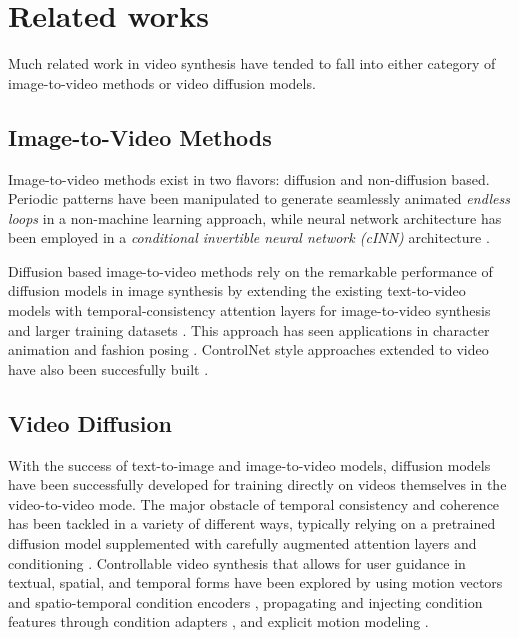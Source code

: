 \section{Related works}
\label{sec:related_work}

Much related work in video synthesis have tended to fall into either category of image-to-video methods or video diffusion models.

\subsection{Image-to-Video Methods}

Image-to-video methods exist in two flavors: diffusion and non-diffusion based. Periodic patterns have been manipulated to generate seamlessly animated \emph{endless loops} \cite{Halperin_2021} in a non-machine learning approach, while neural network architecture has been employed in a \emph{conditional invertible neural network (cINN)} architecture \cite{dorkenwald2021stochasticimagetovideosynthesisusing}.

Diffusion based image-to-video methods rely on the remarkable performance of diffusion models in image synthesis by extending the existing text-to-video models with temporal-consistency attention layers for image-to-video synthesis and larger training datasets \cite{blattmann2023stablevideodiffusionscaling}. This approach has seen applications in character animation \cite{hu2024animateanyoneconsistentcontrollable} and fashion posing \cite{52750}. ControlNet \cite{zhang2023addingconditionalcontroltexttoimage} style approaches extended to video have also been succesfully built \cite{zhang2023controlvideotrainingfreecontrollabletexttovideo}.


\subsection{Video Diffusion}

With the success of text-to-image and image-to-video models, diffusion models have been successfully developed for training directly on videos themselves in the video-to-video mode. The major obstacle of temporal consistency and coherence has been tackled in a variety of different ways, typically relying on a pretrained diffusion model supplemented with carefully augmented attention layers and conditioning \cite{melnik2024videodiffusionmodelssurvey}. Controllable video synthesis that allows for user guidance in textual, spatial, and temporal forms have been explored by using motion vectors and spatio-temporal condition encoders \cite{wang2023videocomposercompositionalvideosynthesis}, propagating and injecting condition features through condition adapters \cite{wang2024easycontroltransfercontrolnetvideo}, and explicit motion modeling \cite{shi2024motioni2vconsistentcontrollableimagetovideo}.

